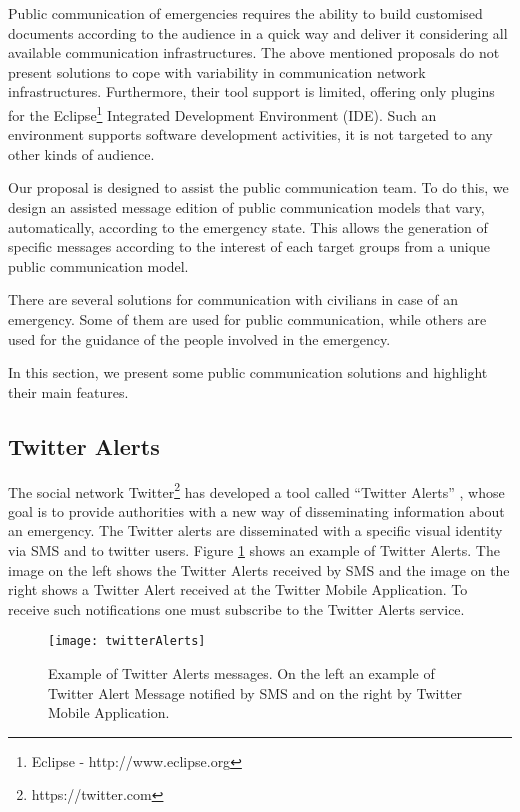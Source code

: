Public communication of emergencies requires the ability to build customised documents according to the audience in a quick way and deliver it considering all available communication infrastructures. The above mentioned proposals do not present solutions to cope with variability in communication network infrastructures. Furthermore, their tool support is limited, offering only plugins for the Eclipse\footnote{Eclipse - http://www.eclipse.org} Integrated Development Environment (IDE). Such an environment supports software development activities, it is not targeted to any other kinds of audience.

Our proposal is designed to assist the public communication team. To do this, we design an assisted message edition of public communication models that vary, automatically, according to the emergency state. This allows the generation of specific messages according to the interest of each target groups from a unique public communication model.

 \label{chapter:PresentSolution}

There are several solutions for communication with civilians in case of an emergency. Some of them are used for public communication, while others are used for the guidance of the people involved in the emergency. 

In this section, we present some public communication solutions and highlight their main features. 
  

\subsection*{Twitter Alerts}

The social network Twitter\footnote{https://twitter.com} has developed a tool called “Twitter Alerts” \cite{twitteralerts}, whose goal is to provide authorities with a new way of disseminating information about an emergency. The Twitter alerts are disseminated with a specific visual identity via SMS and to twitter users. Figure \ref{fig:twitter} shows an example of Twitter Alerts. The image on the left shows the Twitter Alerts received by SMS and the image on the right shows a Twitter Alert received at the Twitter Mobile Application. To receive such notifications one must subscribe to the Twitter Alerts service.

\begin{figure}[]
\begin{center}
  \texttt{[image: twitterAlerts]}
\caption{Example of Twitter Alerts messages. On the left an example of Twitter Alert Message notified by SMS and on the right by Twitter Mobile Application.}
\label{fig:twitter}
\end{center}
\end{figure}

